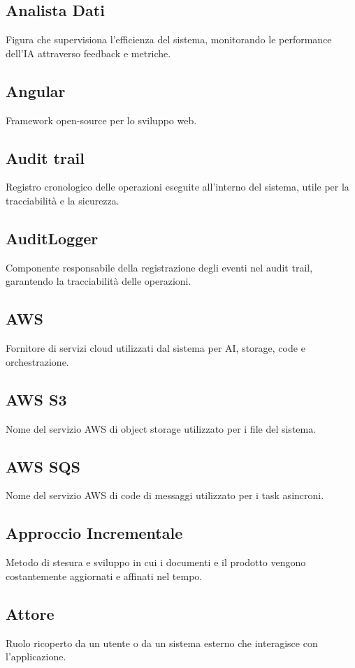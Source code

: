 \documentclass[a4paper,12pt]{article}
\begin{document}
\subsection{Analista Dati}
Figura che supervisiona l'efficienza del sistema, monitorando le performance dell'IA attraverso feedback e metriche.

\subsection{Angular}
Framework open-source per lo sviluppo web.

\subsection{Audit trail}
Registro cronologico delle operazioni eseguite all'interno del sistema, utile per la tracciabilità e la sicurezza.

\subsection{AuditLogger}
Componente responsabile della registrazione degli eventi nel audit trail, garantendo la tracciabilità delle operazioni.

\subsection{AWS}
Fornitore di servizi cloud utilizzati dal sistema per AI, storage, code e orchestrazione.

\subsection{AWS S3}
Nome del servizio AWS di object storage utilizzato per i file del sistema.

\subsection{AWS SQS}
Nome del servizio AWS di code di messaggi utilizzato per i task asincroni.

\subsection{Approccio Incrementale}
Metodo di stesura e sviluppo in cui i documenti e il prodotto vengono costantemente aggiornati e affinati nel tempo.

\subsection{Attore}
Ruolo ricoperto da un utente o da un sistema esterno che interagisce con l'applicazione.
\end{document}
